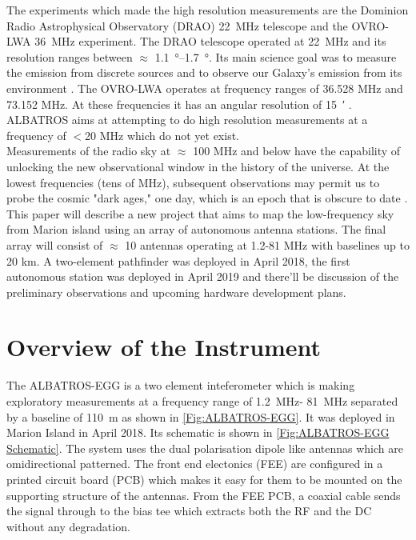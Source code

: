 \documentclass{ws-jai}
\begin{document}
The experiments which made the high resolution measurements are the  Dominion Radio Astrophysical Observatory (DRAO) \SI{22}{\MHz} telescope and the OVRO-LWA \SI{36}{\MHz} experiment. The DRAO telescope operated at \SI{22}{\MHz} and its resolution ranges between $\approx$ \SIrange{1.1}{1.7}{\degree}. Its main science goal was to measure the emission from discrete sources and to observe our Galaxy's emission from its environment \cite{1999A&AS..137....7R}. The OVRO-LWA operates at frequency ranges of 36.528 MHz and 73.152 MHz. At these frequencies it has an angular resolution of \SI{15}{\arcminute} \cite{2018AJ....156...32E}. ALBATROS aims at attempting to do high resolution measurements at a frequency of $<$20 MHz which do not yet exist.\\
	
Measurements of the radio sky at $\approx$ 100 MHz and below have the capability of unlocking the new observational window in the history of the universe. At the lowest frequencies (tens of MHz), subsequent observations may permit us to probe the cosmic "dark ages," one day, which is an epoch that is obscure to date \cite{2019arXiv190710853C, 2019arXiv190804296K}. This paper will describe a new project that aims to map the low-frequency sky from Marion island using an array of autonomous antenna stations. The final array will consist of  $\approx$ 10 antennas operating at 1.2-81 MHz with baselines up to 20 km. A two-element pathfinder was deployed in April 2018, the first autonomous station was deployed in April 2019 and there'll be discussion of the preliminary observations and upcoming hardware development plans.

\section{Overview of the Instrument}

The ALBATROS-EGG is a two element inteferometer which is making exploratory measurements at a frequency range of \SI{1.2}{MHz}- \SI{81}{MHz} separated by a baseline of \SI{110}{m} as shown in \autoref{Fig:ALBATROS-EGG}. It was deployed in Marion Island in April 2018. Its schematic is shown in \autoref{Fig:ALBATROS-EGG Schematic}. The system uses the dual polarisation dipole like antennas which are omidirectional patterned. The front end electonics (FEE) are configured in a printed circuit board (PCB) which makes it easy for them to be mounted on the supporting structure of the antennas. From the FEE PCB, a coaxial cable sends the signal through to the bias tee which extracts both the RF and the DC without any degradation. \\
\end{document}
